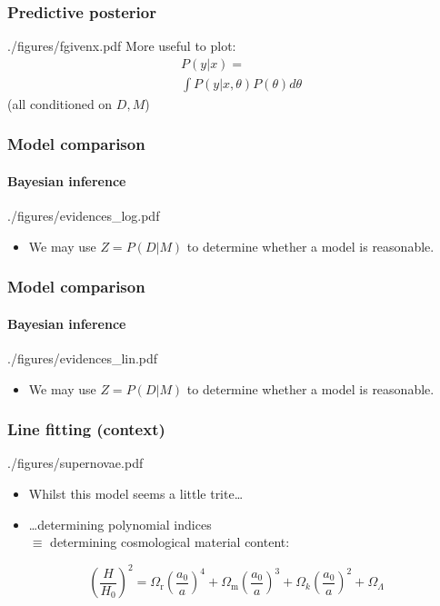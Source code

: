 \documentclass[%
]{beamer}
\begin{document}
\begin{frame}
    \frametitle{Predictive posterior}
    \begin{figright}[0.4]{./figures/fgivenx.pdf}
        More useful to plot:
        \begin{align}
        &P(y|x) = \nonumber\\
        &\int P(y|x,\theta) P(\theta) d\theta \nonumber
        \end{align}
        (all conditioned on $D,M$)
    \end{figright}
\end{frame}

\begin{frame}
    \frametitle{Model comparison}
    \framesubtitle{Bayesian inference}
    \begin{figright}[0.33]{./figures/evidences_log.pdf}
        \begin{itemize}
            \item We may use $Z=P(D|M)$ to determine whether a model is reasonable.
        \end{itemize}
    \end{figright}
\end{frame}
\begin{frame}
    \frametitle{Model comparison}
    \framesubtitle{Bayesian inference}
    \begin{figright}[0.33]{./figures/evidences_lin.pdf}
        \begin{itemize}
            \item We may use $Z=P(D|M)$ to determine whether a model is reasonable.
        \end{itemize}
    \end{figright}
\end{frame}

\begin{frame}
    \frametitle{Line fitting (context)}
    \begin{figright}[0.5]{./figures/supernovae.pdf}
        \begin{itemize}
            \item Whilst this model seems a little trite\ldots
            \item\ldots determining polynomial indices \\$\equiv$ determining cosmological material content:
        \end{itemize}
    \end{figright}
        \[
            {\left( \frac{H}{H_0} \right)}^2 = 
            \Omega_\text{r} {\left( \frac{a_0}{a} \right)}^4+
            \Omega_\text{m} {\left( \frac{a_0}{a} \right)}^3+
            \Omega_k {\left( \frac{a_0}{a} \right)}^2+
            \Omega_\Lambda
            \]
\end{frame}
\end{document}

